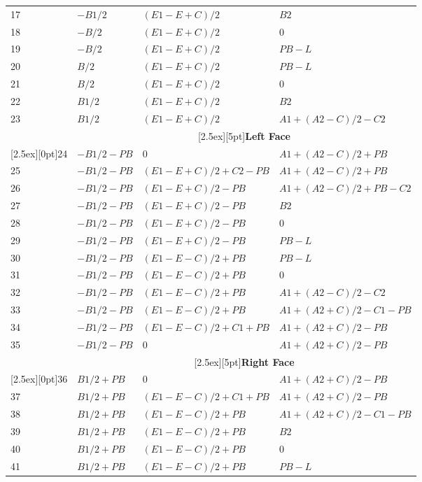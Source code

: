 \documentclass[a4paper, dvipdfm]{article}
\begin{document}
\begin{longtable}{|l|l|l|l|}
17 & $-B1/2$   & $(E1-E+C)/2$        & $B2$\\
18 & $-B/2$    & $(E1-E+C)/2$        & $0$\\
19 & $-B/2$    & $(E1-E+C)/2$        & $PB-L$\\
20 & $B/2$     & $(E1-E+C)/2$        & $PB-L$\\
21 & $B/2$     & $(E1-E+C)/2$        & $0$\\
22 & $B1/2$    & $(E1-E+C)/2$        & $B2$\\
23 & $B1/2$    & $(E1-E+C)/2$        & $A1+(A2-C)/2-C2$\\
\cline{2-4}
&\multicolumn{3}{|c|}{\raisebox{0pt}[2.5ex][5pt]{\textbf{Left Face}}}\\\cline{2-4}
\raisebox{0pt}[2.5ex][0pt]{24}
   & $-B1/2-PB$ & $0$                & $A1+(A2-C)/2+PB$\\
25 & $-B1/2-PB$ & $(E1-E+C)/2+C2-PB$ & $A1+(A2-C)/2+PB$\\
26 & $-B1/2-PB$ & $(E1-E+C)/2-PB$    & $A1+(A2-C)/2+PB-C2$\\
27 & $-B1/2-PB$ & $(E1-E+C)/2-PB$    & $B2$\\
28 & $-B1/2-PB$ & $(E1-E+C)/2-PB$    & $0$\\
29 & $-B1/2-PB$ & $(E1-E+C)/2-PB$    & $PB-L$\\
30 & $-B1/2-PB$ & $(E1-E-C)/2+PB$    & $PB-L$\\
31 & $-B1/2-PB$ & $(E1-E-C)/2+PB$    & $0$\\
32 & $-B1/2-PB$ & $(E1-E-C)/2+PB$    & $A1+(A2-C)/2-C2$\\
33 & $-B1/2-PB$ & $(E1-E-C)/2+PB$    & $A1+(A2+C)/2-C1-PB$\\
34 & $-B1/2-PB$ & $(E1-E-C)/2+C1+PB$ & $A1+(A2+C)/2-PB$\\
35 & $-B1/2-PB$ & $0$                & $A1+(A2+C)/2-PB$\\
\cline{2-4}
&\multicolumn{3}{|c|}{\raisebox{0pt}[2.5ex][5pt]{\textbf{Right Face}}}\\\cline{2-4}
\raisebox{0pt}[2.5ex][0pt]{36}
   & $B1/2+PB$  & $0$                & $A1+(A2+C)/2-PB$\\
37 & $B1/2+PB$  & $(E1-E-C)/2+C1+PB$ & $A1+(A2+C)/2-PB$\\
38 & $B1/2+PB$  & $(E1-E-C)/2+PB$    & $A1+(A2+C)/2-C1-PB$\\
39 & $B1/2+PB$  & $(E1-E-C)/2+PB$    & $B2$\\
40 & $B1/2+PB$  & $(E1-E-C)/2+PB$    & $0$\\
41 & $B1/2+PB$  & $(E1-E-C)/2+PB$    & $PB-L$\\

\end{longtable}
\end{document}
